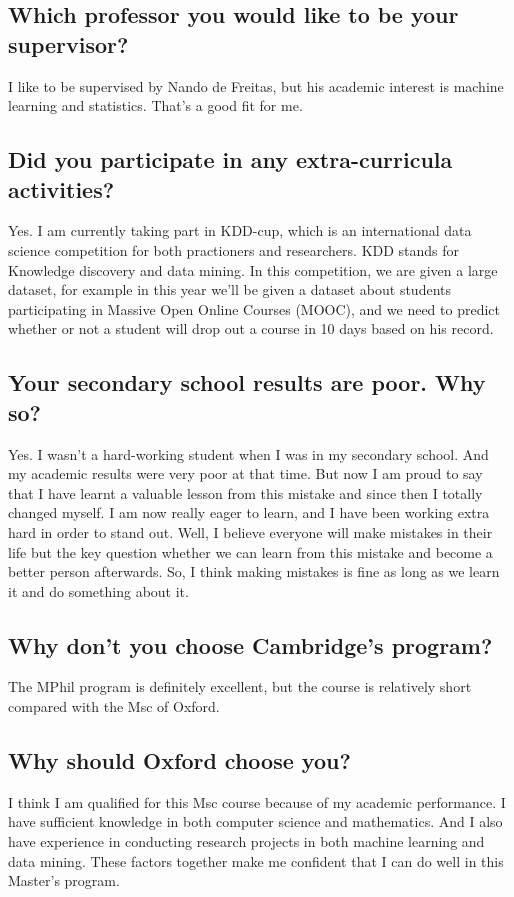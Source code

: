 \documentclass[12pt, landscape]{article}
\begin{document}
\begin{multicols}{2}
\subsection{Which professor you would like to be your supervisor?}
I like to be supervised by Nando de Freitas, but his academic interest is machine learning and statistics. That's a good fit for me.

\subsection{Did you participate in any extra-curricula activities?}
Yes. I am currently taking part in KDD-cup, which is an international data science competition for both practioners and researchers. KDD stands for Knowledge discovery and data mining. In this competition, we are given a large dataset, for example in this year we'll be given a dataset about students participating in Massive Open Online Courses (MOOC), and we need to predict whether or not a student will drop out a course in 10 days based on his record.


\subsection{ Your secondary school results are poor. Why so?}
Yes. I wasn't a hard-working student when I was in my secondary school. And my academic results were very poor at that time.
But now I am proud to say that I have learnt a valuable lesson from this mistake and since then I totally changed myself. I am now really eager to learn, and I have been working extra hard in order to stand out. Well, I believe everyone will make mistakes in their life but the key question whether we can learn from this mistake and become a better person afterwards. So, I think making mistakes is fine as long as we learn it and do something about it.

\subsection{Why don't you choose Cambridge's program?}
The MPhil program is definitely excellent, but the course is relatively short compared with the Msc of Oxford.

\subsection{Why should Oxford choose you?}
I think I am qualified for this Msc course because of my academic performance. I have sufficient knowledge in both computer science and mathematics. And I also have experience in conducting research projects in both machine learning and data mining. These factors together make me confident that I can do well in this Master's program.



\end{multicols}
\end{document}
